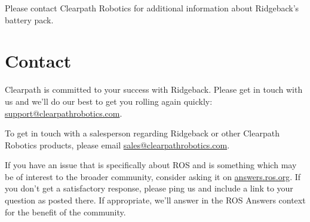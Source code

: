 \documentclass[]{clearpath-latex/clearpath-manual}
\begin{document}
Please contact Clearpath Robotics for additional information about Ridgeback's battery pack.


%
%
%
%
%

\section{Contact}
\label{contact}

Clearpath is committed to your success with Ridgeback. Please get in touch with us and we’ll do our best to get
you rolling again quickly: \url{support@clearpathrobotics.com}.

To get in touch with a salesperson regarding Ridgeback or other Clearpath Robotics products, please email
\url{sales@clearpathrobotics.com}.

If you have an issue that is specifically about ROS and is something which may be of interest to the broader
community, consider asking it on \url{answers.ros.org}. If you don’t get a satisfactory response, please ping us and
include a link to your question as posted there. If appropriate, we’ll answer in the ROS Answers context for
the benefit of the community.
\end{document}
